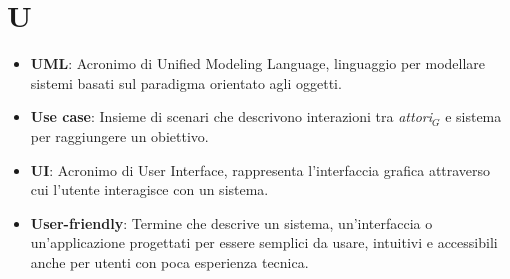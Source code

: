 \section{U}
\begin{itemize}
    \item \textbf{UML}: Acronimo di Unified Modeling Language, linguaggio per modellare sistemi basati sul paradigma orientato agli oggetti.
    \item \textbf{Use case}: Insieme di scenari che descrivono interazioni tra \textit{attori}$_G$ e sistema per raggiungere un obiettivo.
    \item \textbf{UI}: Acronimo di User Interface, rappresenta l'interfaccia grafica attraverso cui l'utente interagisce con un sistema.
    \item \textbf{User-friendly}: Termine che descrive un sistema, un'interfaccia o un'applicazione progettati per essere semplici da usare, intuitivi e accessibili anche per utenti con poca esperienza tecnica.
\end{itemize}
